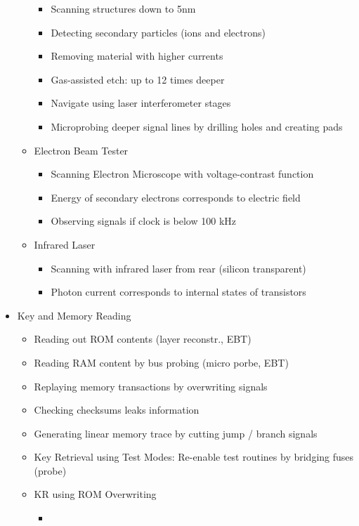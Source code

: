\documentclass[11pt, paper=a4, twocolumn]{scrartcl}
\begin{document}
\begin{itemize}
\begin{itemize}
\begin{itemize}
							\item Scanning structures down to 5nm
							\item Detecting secondary particles (ions and electrons)
							\item Removing material with higher currents
							\item Gas-assisted etch: up to 12 times deeper
							\item Navigate using laser interferometer stages
							\item Microprobing deeper signal lines by drilling holes and creating pads
						\end{itemize}
					\item Electron Beam Tester
						\begin{itemize}
							\item Scanning Electron Microscope with voltage-contrast function
							\item Energy of secondary electrons corresponds to electric field
							\item Observing signals if clock is below 100 kHz
						\end{itemize}
					\item Infrared Laser
						\begin{itemize}
							\item Scanning with infrared laser from rear (silicon transparent)
							\item Photon current corresponds to internal states of transistors
						\end{itemize}
				\end{itemize}
			\item Key and Memory Reading
				\begin{itemize}
					\item Reading out ROM contents (layer reconstr., EBT)
					\item Reading RAM content by bus probing (micro porbe, EBT)
					\item Replaying memory transactions by overwriting signals
					\item Checking checksums leaks information
					\item Generating linear memory trace by cutting jump / branch signals
					\item Key Retrieval using Test Modes: Re-enable test routines by bridging fuses (probe)
					\item KR using ROM Overwriting
						\begin{itemize}
							\item 

\end{itemize}
\end{itemize}
\end{itemize}
\end{document}

